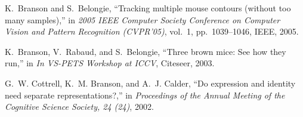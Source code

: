 \begin{cvenum}
\item K.~Branson and S.~Belongie, ``Tracking multiple mouse contours (without too
  many samples),'' in {\em 2005 IEEE Computer Society Conference on Computer
  Vision and Pattern Recognition (CVPR'05)}, vol.~1, pp.~1039--1046, IEEE,
  2005.

\item K.~Branson, V.~Rabaud, and S.~Belongie, ``Three brown mice: See how they run,''
  in {\em In VS-PETS Workshop at ICCV}, Citeseer, 2003.

\item G.~W. Cottrell, K.~M. Branson, and A.~J. Calder, ``Do expression and identity
  need separate representations?,'' in {\em Proceedings of the Annual Meeting
  of the Cognitive Science Society, 24 (24)}, 2002.

\end{cvenum}
